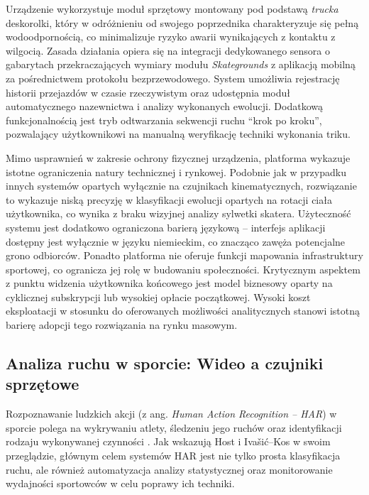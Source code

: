             Urządzenie wykorzystuje moduł sprzętowy montowany pod podstawą \textit{trucka} deskorolki, który w odróżnieniu od swojego poprzednika charakteryzuje się pełną wodoodpornością, co minimalizuje ryzyko awarii wynikających z kontaktu z wilgocią. Zasada działania opiera się na integracji dedykowanego sensora o gabarytach przekraczających wymiary modułu \textit{Skategrounds} z aplikacją mobilną za pośrednictwem protokołu bezprzewodowego. System umożliwia rejestrację historii przejazdów w czasie rzeczywistym oraz udostępnia moduł automatycznego nazewnictwa i analizy wykonanych ewolucji. Dodatkową funkcjonalnością jest tryb odtwarzania sekwencji ruchu \enquote{krok po kroku}, pozwalający użytkownikowi na manualną weryfikację techniki wykonania triku.          
            
            Mimo usprawnień w zakresie ochrony fizycznej urządzenia, platforma wykazuje istotne ograniczenia natury technicznej i rynkowej. Podobnie jak w przypadku innych systemów opartych wyłącznie na czujnikach kinematycznych, rozwiązanie to wykazuje niską precyzję w klasyfikacji ewolucji opartych na rotacji ciała użytkownika, co wynika z braku wizyjnej analizy sylwetki skatera. Użyteczność systemu jest dodatkowo ograniczona barierą językową – interfejs aplikacji dostępny jest wyłącznie w języku niemieckim, co znacząco zawęża potencjalne grono odbiorców. Ponadto platforma nie oferuje funkcji mapowania infrastruktury sportowej, co ogranicza jej rolę w budowaniu społeczności. Krytycznym aspektem z punktu widzenia użytkownika końcowego jest model biznesowy oparty na cyklicznej subskrypcji lub wysokiej opłacie początkowej. Wysoki koszt eksploatacji w stosunku do oferowanych możliwości analitycznych stanowi istotną barierę adopcji tego rozwiązania na rynku masowym.

    \subsection{Analiza ruchu w sporcie: Wideo a czujniki sprzętowe}
        Rozpoznawanie ludzkich akcji (z ang. \textit{Human Action Recognition – HAR}) w sporcie polega na wykrywaniu atlety, śledzeniu jego ruchów oraz identyfikacji rodzaju wykonywanej czynności \cite{host2022overview}. Jak wskazują Host i Ivašić–Kos \cite{host2022overview} w swoim przeglądzie, głównym celem systemów HAR jest nie tylko prosta klasyfikacja ruchu, ale również automatyzacja analizy statystycznej oraz monitorowanie wydajności sportowców w celu poprawy ich techniki\cite{host2022overview}.


